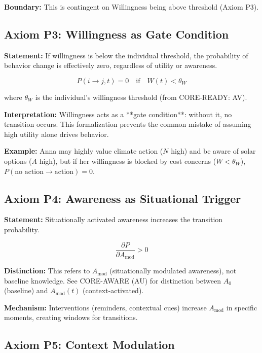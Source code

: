 \documentclass[11pt, a4paper]{article}
\begin{document}
\textbf{Boundary:} This is contingent on Willingness being above threshold (Axiom P3).

\subsection{Axiom P3: Willingness as Gate Condition}

\textbf{Statement:} If willingness is below the individual threshold, the probability of behavior change is effectively zero, regardless of utility or awareness.

\begin{equation}
P(i \to j, t) = 0 \quad \text{if} \quad W(t) < \theta_W
\end{equation}

where $\theta_W$ is the individual's willingness threshold (from CORE-READY: AV).

\textbf{Interpretation:} Willingness acts as a **gate condition**: without it, no transition occurs. This formalization prevents the common mistake of assuming high utility alone drives behavior.

\textbf{Example:} Anna may highly value climate action ($N$ high) and be aware of solar options ($A$ high), but if her willingness is blocked by cost concerns ($W < \theta_W$), $P(\text{no action} \to \text{action}) = 0$.

\subsection{Axiom P4: Awareness as Situational Trigger}

\textbf{Statement:} Situationally activated awareness increases the transition probability.

\begin{equation}
\frac{\partial P}{\partial A_{\text{mod}}} > 0
\end{equation}

\textbf{Distinction:} This refers to $A_{\text{mod}}$ (situationally modulated awareness), not baseline knowledge. See CORE-AWARE (AU) for distinction between $A_0$ (baseline) and $A_{\text{mod}}(t)$ (context-activated).

\textbf{Mechanism:} Interventions (reminders, contextual cues) increase $A_{\text{mod}}$ in specific moments, creating windows for transitions.

\subsection{Axiom P5: Context Modulation}
\end{document}
